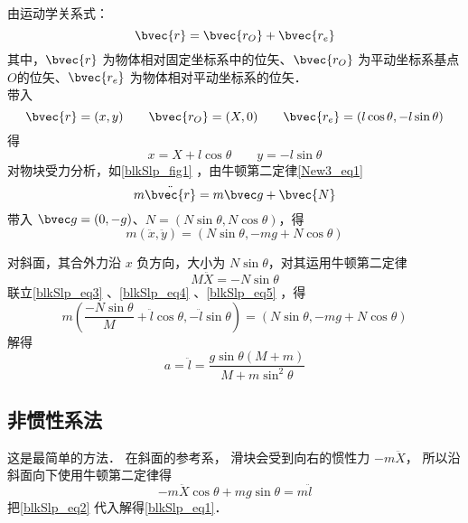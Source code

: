由运动学关系式：
\begin{equation}
\bvec{r}=\bvec{r_{O}}+\bvec{r_{e}}
\end{equation}
其中，$\bvec{r}$ 为物体相对固定坐标系中的位矢、$\bvec{r_{O}}$ 为平动坐标系基点$O$的位矢、$\bvec{r_{e}}$ 为物体相对平动坐标系的位矢．\\
带入
\begin{equation}
\bvec{r}=(x,y)\qquad \bvec{r_O}=(X,0)\qquad \bvec{r_e}=(l\cos\theta,-l\sin\theta)
\end{equation}
得
\begin{equation}\label{blkSlp_eq3}
x=X+l\cos\theta \qquad y=-l\sin\theta
\end{equation}
对物块受力分析，如\autoref{blkSlp_fig1} ，由牛顿第二定律\autoref{New3_eq1}~
\begin{equation}
m\ddot{\bvec{r}}=m\bvec g+\bvec{N}
\end{equation}
带入 $\bvec g=(0,-g)$、$N=(N\sin\theta,N\cos\theta)$，得
\begin{equation}\label{blkSlp_eq4}
m(\ddot x,\ddot y)=(N\sin\theta,-mg+N\cos\theta)
\end{equation}

对斜面，其合外力沿 $x$ 负方向，大小为 $N\sin\theta$，对其运用牛顿第二定律
\begin{equation}\label{blkSlp_eq5}
M\ddot X=-N\sin \theta
\end{equation}
联立\autoref{blkSlp_eq3} 、\autoref{blkSlp_eq4} 、\autoref{blkSlp_eq5} ，得
\begin{equation}
m(\frac{-N\sin\theta}{M}+\ddot l\cos\theta,-\ddot l\sin\theta)=(N\sin\theta,-mg+N\cos\theta)
\end{equation}
解得
\begin{equation}
a = \ddot l = \frac{g\sin\theta(M+m)}{M + m\sin^2\theta}
\end{equation}

\subsection{非惯性系法}
这是最简单的方法． 在斜面的参考系， 滑块会受到向右的惯性力 $-m\ddot X$， 所以沿斜面向下使用牛顿第二定律得
\begin{equation}
-m\ddot X\cos\theta + mg\sin\theta = m\ddot l
\end{equation}
把\autoref{blkSlp_eq2} 代入解得\autoref{blkSlp_eq1}．

